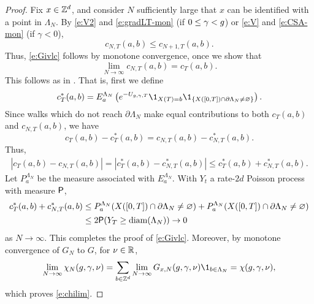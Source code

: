 \begin{proof}
Fix $x \in { {{\mathbb Z}}^d }$, and consider $N$ sufficiently large that $x$ can be identified
with a point in $\Lambda_N$.
By \eqref{e:V2} and \eqref{e:gradLT-mon} (if $0 \le \gamma <g$)
or \eqref{e:V} and \eqref{e:CSA-mon} (if $\gamma < 0$),
\begin{equation}
\label{e:ctmon}
c_{N,T}(a, b) \leq c_{N+1,T}(a, b).
\end{equation}
Thus, \eqref{e:Givlc} follows by monotone convergence, once we show that
\begin{equation}
\lim_{N\to\infty} c_{N,T}(a, b) = c_T(a, b).
\end{equation}
This follows as in \cite[(2.8)]{BBS-saw4}.
That is, first we define
\begin{equation}
c_T^*(a, b)
  =
E^{\Lambda_N}_a
\left(
  e^{-U_{\gcc,\gamma,T}} \1_{X(T)=b} \1_{\{X([0, T]) \cap \partial \Lambda_N \neq \varnothing\}}
\right).
\end{equation}
Since walks which do not reach $\partial \Lambda_N$ make equal contributions to both
$c_T(a,b)$ and $c_{N,T}(a,b)$,
we have
\begin{equation}
c_T(a, b) - c_T^*(a, b) = c_{N,T}(a, b) - c_{N,T}^*(a, b).
\end{equation}
Thus,
\begin{align}
|c_T(a, b) - c_{N,T}(a, b)|
= |c_T^*(a, b) - c_{N,T}^*(a, b)|
\leq c_T^*(a, b) + c_{N,T}^*(a, b).
\end{align}
Let $P^{\Lambda_N}_a$ be the measure associated with $E^{\Lambda_N}_a$.
With $Y_t$ a rate-$2d$ Poisson process with measure ${\sf P}$,
\begin{align}
  c_T^*(a, b) + c_{N,T}^*(a, b)
  &\leq P^{\Lambda_N}_a (X([0, T]) \cap \partial\Lambda_N \neq \varnothing)
    + P^{\Lambda_N}_a (X([0, T]) \cap \partial\Lambda_N \neq \varnothing) \nonumber \\
  &\leq 2 {\sf P} (Y_T \geq \textrm{diam}(\Lambda_N)) \rightarrow 0
\end{align}
as $N\to\infty$.
This completes the proof of \eqref{e:Givlc}.
Moreover, by monotone convergence of $G_N$ to $G$,
for $\nu \in {\mathbb R}$,
\begin{equation}
\lim_{N\to\infty} \chi_N(\gcc, \gamma, \nu)
    = \sum_{b\in\Zd} \lim_{N\to\infty} G_{x,N}(\gcc, \gamma, \nu) \1_{b\in\Lambda_N}
    = \chi(\gcc, \gamma, \nu),
\end{equation}
which proves \eqref{e:chilim}.
\end{proof}

